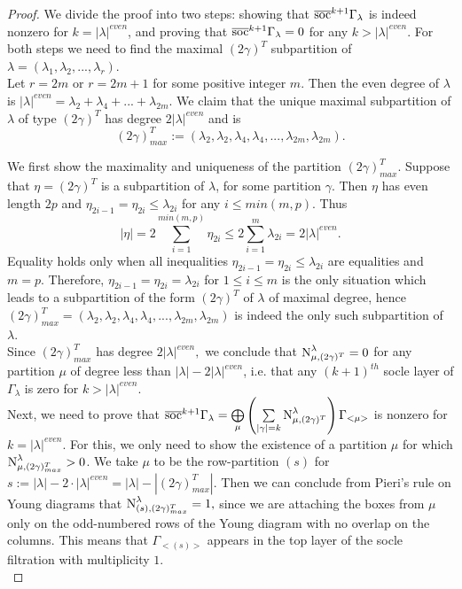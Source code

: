 \documentclass[main.tex]{subfiles}
\begin{document}
\begin{proof}
    We divide the proof into two steps: showing that $\overline{\text{soc}}^{k+1}\Gamma_\lambda$  is indeed nonzero for $k=|\lambda|^{even}$, and proving that $\overline{\text{soc}}^{k+1}\Gamma_\lambda=0$ for any $k>|\lambda|^{even}.$ For both steps we need to find the maximal $(2\gamma)^T$ subpartition of $\lambda = (\lambda_1, \lambda_2, ..., \lambda_r).$  \\

    Let $r=2m$ or $r=2m+1$ for some positive integer $m.$ Then the even degree of $\lambda$ is $|\lambda|^{even} = \lambda_2+\lambda_4+...+\lambda_{2m}$. We claim that the unique maximal subpartition of $\lambda$ of type $(2\gamma)^T$ has degree $2|\lambda|^{even}$ and is $$(2\gamma)^T_{max}:=(\lambda_2, \lambda_2, \lambda_4, \lambda_4, ..., \lambda_{2m}, \lambda_{2m}).$$ 

    We first show the maximality and uniqueness of the partition $(2\gamma)^T_{max}$.
    Suppose that $\eta=(2\gamma)^T$  is a subpartition of $\lambda$, for some partition $\gamma$. Then $\eta$ has even length $2p$ and $\eta_{2i-1}=\eta_{2i}\leq \lambda_{2i}$ for any $i\leq min(m,p)$. Thus 
    $$
    |\eta|=2\sum\limits_{i=1}^{min(m,p)}\eta_{2i}\leq 2\sum\limits_{i=1}^{m}\lambda_{2i} = 2|\lambda|^{even}. 
    $$
    Equality holds only when all inequalities $\eta_{2i-1}=\eta_{2i}\leq \lambda_{2i}$ are equalities and $m=p$. Therefore, $\eta_{2i-1}=\eta_{2i}=\lambda_{2i}$ for $1\leq i\leq m$ is the only situation which leads to a subpartition of the form $(2\gamma)^T$ of $\lambda$ of maximal degree, hence $(2\gamma)^T_{max}=(\lambda_2, \lambda_2, \lambda_4, \lambda_4, ..., \lambda_{2m}, \lambda_{2m})$ is indeed the only such subpartition of $\lambda$.\\

    Since $(2\gamma)^T_{max}$ has degree $2|\lambda|^{even},$ we conclude that $\text{N}^{\lambda}_{\mu, (2\gamma)^T}=0$ for any partition $\mu$ of degree less than $|\lambda|-2|\lambda|^{even}$, i.e. that
    any $(k+1)^{th}$ socle layer of $\Gamma_\lambda$ is zero for $k>|\lambda|^{even}$.\\  

    Next, we need to prove that $\overline{\text{soc}}^{k+1}\Gamma_\lambda = \bigoplus\limits_{\mu} \left( \sum\limits_{|\gamma|=k} \text{N}^{\lambda}_{\mu, (2\gamma)^T} \right) \Gamma_{<\mu>} 
   $ is nonzero for $ k = |\lambda|^{even}.$ For this, we only need to show the existence of a partition $\mu$ for which $\text{N}^{\lambda}_{\mu, (2\gamma)^T_{max}}>0$. 
  We take $\mu$ to be the row-partition $(s)$ for $s := |\lambda|-2\cdot |\lambda|^{even} = |\lambda| - |{(2\gamma)^T_{max}}|.$ Then we can conclude from Pieri's rule on Young diagrams that  $\text{N}^{\lambda}_{(s), (2\gamma)^T_{max}}=1,$ since we are attaching the boxes from $\mu$ only on the odd-numbered rows of the Young diagram with no overlap on the columns. This means that $\Gamma_{<(s)>}$ appears in the top layer of the socle filtration with multiplicity $1$.\\

\end{proof}
\end{document}
